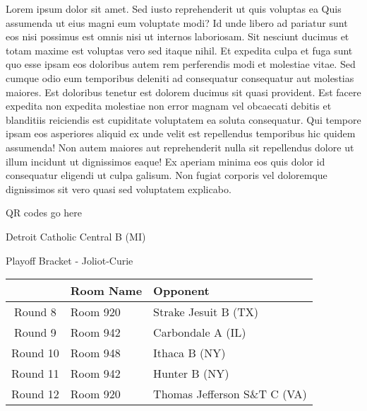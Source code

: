 \documentclass{article}%
\begin{document}
\vspace*{8pt}%
\linebreak%
\newline%
\newline%
Lorem ipsum dolor sit amet. Sed iusto reprehenderit ut quis voluptas ea Quis assumenda ut eius magni eum voluptate modi? Id unde libero ad pariatur sunt eos nisi possimus est omnis nisi ut internos laboriosam. Sit nesciunt ducimus et totam maxime est voluptas vero sed itaque nihil. Et expedita culpa et fuga sunt quo esse ipsam eos doloribus autem rem perferendis modi et molestiae vitae.\newline%
\newline%
Sed cumque odio eum temporibus deleniti ad consequatur consequatur aut molestias maiores. Est doloribus tenetur est dolorem ducimus sit quasi provident. Est facere expedita non expedita molestiae non error magnam vel obcaecati debitis et blanditiis reiciendis est cupiditate voluptatem ea soluta consequatur. Qui tempore ipsam eos asperiores aliquid ex unde velit est repellendus temporibus hic quidem assumenda!\newline%
\newline%
Non autem maiores aut reprehenderit nulla sit repellendus dolore ut illum incidunt ut dignissimos eaque! Ex aperiam minima eos quis dolor id consequatur eligendi ut culpa galisum. Non fugiat corporis vel doloremque dignissimos sit vero quasi sed voluptatem explicabo.\newline%
\newline%
%
\vspace*{30pt}%
\begin{center}%
\begin{Huge}%
QR codes go here%
\end{Huge}%
\end{center}%
\newpage%
\begin{center}%
\begin{Huge}%
Detroit Catholic Central B (MI)%
\end{Huge}%
\vspace*{8pt}%
\linebreak%
\begin{Large}%
Playoff Bracket {-} Joliot{-}Curie%
\end{Large}%
\end{center}%
%
\begin{tabularx}{\textwidth}{|c|Y|Y|}%
\hline%
&Room Name&Opponent\\%
\hline%
Round 8&Room 920&Strake Jesuit B (TX)\\%
Round 9&Room 942&Carbondale A (IL)\\%
Round 10&Room 948&Ithaca B (NY)\\%
Round 11&Room 942&Hunter B (NY)\\%
Round 12&Room 920&Thomas Jefferson S\&T C (VA)\\%
\hline%
\end{tabularx}%
\end{document}
